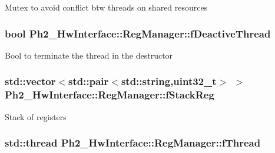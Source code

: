 Mutex to avoid conflict btw threads on shared resources \hypertarget{class_ph2___hw_interface_1_1_reg_manager_ae337041a55b10db74bbd8e171424807a}{
\subsubsection[{f\-Deactive\-Thread}]{\setlength{\rightskip}{0pt plus 5cm}bool Ph2\-\_\-\-Hw\-Interface\-::\-Reg\-Manager\-::f\-Deactive\-Thread\hspace{0.3cm}{\ttfamily [protected]}}}\label{class_ph2___hw_interface_1_1_reg_manager_ae337041a55b10db74bbd8e171424807a}
Bool to terminate the thread in the destructor \hypertarget{class_ph2___hw_interface_1_1_reg_manager_a42f9437febcc01def682f69714e609ee}{
\subsubsection[{f\-Stack\-Reg}]{\setlength{\rightskip}{0pt plus 5cm}std\-::vector$<$std\-::pair$<$std\-::string,uint32\-\_\-t$>$ $>$ Ph2\-\_\-\-Hw\-Interface\-::\-Reg\-Manager\-::f\-Stack\-Reg\hspace{0.3cm}{\ttfamily [protected]}}}\label{class_ph2___hw_interface_1_1_reg_manager_a42f9437febcc01def682f69714e609ee}
Stack of registers \hypertarget{class_ph2___hw_interface_1_1_reg_manager_a3aa2f1c4769f122a2e902f2d70865b30}{
\subsubsection[{f\-Thread}]{\setlength{\rightskip}{0pt plus 5cm}std\-::thread Ph2\-\_\-\-Hw\-Interface\-::\-Reg\-Manager\-::f\-Thread\hspace{0.3cm}{\ttfamily [protected]}}}\label{class_ph2___hw_interface_1_1_reg_manager_a3aa2f1c4769f122a2e902f2d70865b30}
